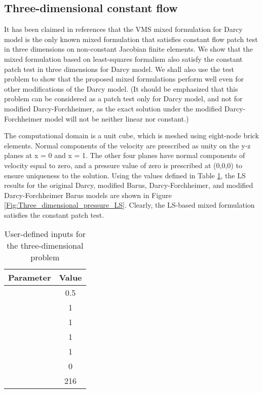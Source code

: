 \documentclass[11pt,reqno]{amsart}
\begin{document}
\subsection{Three-dimensional constant flow}
It has been claimed in references 
\cite{Nakshatrala_Turner_Hjelmstad_Masud_CMAME_2006_v195_p4036,
Hughes_Masud_Wan_CMAME_2006_v195_p3347} that the VMS mixed 
formulation for Darcy model is the only known mixed 
formulation that satisfies constant flow patch test 
in three dimensions on non-constant Jacobian finite 
elements. 
We show that the mixed formulation based on least-squares 
formalism also satisfy the constant patch test in three 
dimensions for Darcy model. We shall also use the test 
problem to show that the proposed mixed formulations 
perform well even for other modifications of the Darcy 
model. (It should be emphasized that this problem can 
be considered as a patch test only for Darcy model, 
and not for modified Darcy-Forchheimer, as the 
exact solution under the modified Darcy-Forchheimer 
model will not be neither linear nor constant.)  

The computational domain is a unit cube, which is meshed 
using eight-node brick elements. Normal components of the 
velocity are prescribed as unity on the y-z planes at x = 
0 and x = 1. The other four planes have normal components 
of velocity equal to zero, and a pressure value of zero 
is prescribed at (0,0,0) to ensure uniqueness to the 
solution. Using the values defined in Table 
\ref{Tab:three_dimensional}, the LS results for the 
original Darcy, modified Barus, Darcy-Forchheimer, 
and modified Darcy-Forchheimer Barus models are shown 
in Figure \ref{Fig:Three_dimensional_pressure_LS}. 
Clearly, the LS-based mixed formulation satisfies 
the constant patch test. 

\begin{table}[b!]
  \centering
  \caption{User-defined inputs for the three-dimensional problem}
  \begin{tabular}{cc}
    \hline
    Parameter & Value \\ \hline
     & 0.5\\
     & 1\\	
     & 1\\
     & 1\\
     & 1 \\
     & 0 \\
     & 216\\
    \hline
  \end{tabular}
  \label{Tab:three_dimensional}
\end{table}
\end{document}
